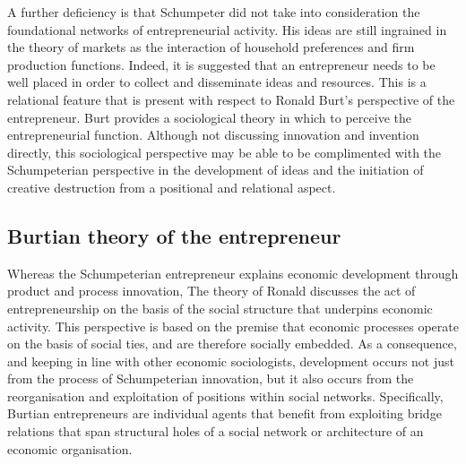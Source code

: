 A further deficiency is that Schumpeter did not take into consideration the foundational networks of entrepreneurial activity. His ideas are still ingrained in the theory of markets as the interaction of household preferences and firm production functions. Indeed, it is suggested that an entrepreneur needs to be well placed in order to collect and disseminate ideas and resources. This is a relational feature that is present with respect to Ronald Burt's perspective of the entrepreneur. Burt provides a sociological theory in which to perceive the entrepreneurial function. Although not discussing innovation and invention directly, this sociological perspective may be able to be complimented with the Schumpeterian perspective in the development of ideas and the initiation of creative destruction from a positional and relational aspect.

\subsection{Burtian theory of the entrepreneur}

Whereas the Schumpeterian entrepreneur explains economic development through product and process innovation, The theory of Ronald \citet{Burt1992, Burt2005, Burt2010} discusses the act of entrepreneurship on the basis of the social structure that underpins economic activity. This perspective is based on the premise that economic processes operate on the basis of social ties, and are therefore socially embedded. As a consequence, and keeping in line with other economic sociologists, development occurs not just from the process of Schumpeterian innovation, but it also occurs from the reorganisation and exploitation of positions within social networks. Specifically, Burtian entrepreneurs are individual agents that benefit from exploiting bridge relations that span structural holes of a social network or architecture of an economic organisation.

